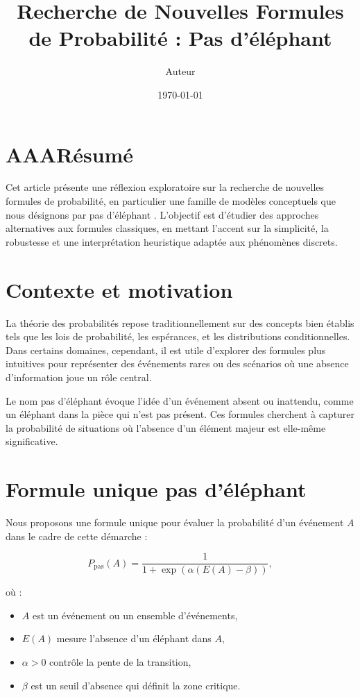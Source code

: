\documentclass{article}
\begin{document}
\title{Recherche de Nouvelles Formules de Probabilité : \og Pas d'éléphant \fg}
\author{Auteur}
\date{\today}
\maketitle

\section{AAARésumé}
Cet article présente une réflexion exploratoire sur la recherche de nouvelles formules de probabilité, en particulier une famille de modèles conceptuels que nous désignons par \og pas d'éléphant \fg. L'objectif est d'étudier des approches alternatives aux formules classiques, en mettant l'accent sur la simplicité, la robustesse et une interprétation heuristique adaptée aux phénomènes discrets.

\section{Contexte et motivation}
La théorie des probabilités repose traditionnellement sur des concepts bien établis tels que les lois de probabilité, les espérances, et les distributions conditionnelles. Dans certains domaines, cependant, il est utile d'explorer des formules plus intuitives pour représenter des événements rares ou des scénarios où une absence d'information joue un rôle central.

Le nom \og pas d'éléphant \fg évoque l'idée d'un événement absent ou inattendu, comme un \og éléphant dans la pièce \fg qui n'est pas présent. Ces formules cherchent à capturer la probabilité de situations où l'absence d'un élément majeur est elle-même significative.

\section{Formule unique \og pas d'éléphant \fg}
Nous proposons une formule unique pour évaluer la probabilité d'un événement $A$ dans le cadre de cette démarche :

\begin{equation}
P_{\text{pas}}(A) = \frac{1}{1 + \exp\left(\alpha\left(E(A) - \beta\right)\right)},
\end{equation}

où :
\begin{itemize}
  \item $A$ est un événement ou un ensemble d'événements,
  \item $E(A)$ mesure l'absence d'un \og éléphant \fg{} dans $A$,
  \item $\alpha > 0$ contrôle la pente de la transition,
  \item $\beta$ est un seuil d'absence qui définit la zone critique.
\end{itemize}
\end{document}

